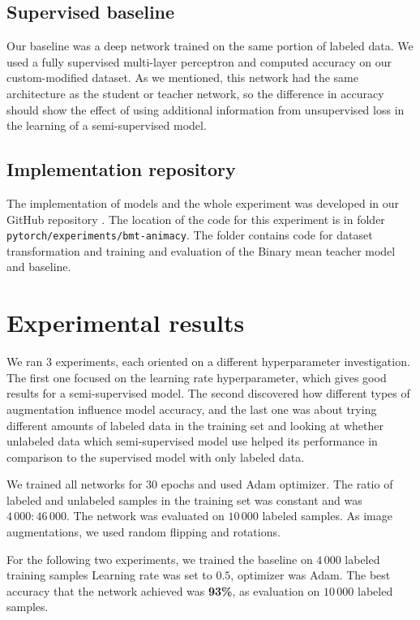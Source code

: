 \subsection{Supervised baseline}
Our baseline was a deep network trained on the same portion of labeled data. We used a fully supervised multi-layer perceptron and computed accuracy on our custom-modified dataset. As we mentioned, this network had the same architecture as the student or teacher network, so the difference in accuracy should show the effect of using additional information from unsupervised loss in the learning of a semi-supervised model. 

\subsection{Implementation repository}
The implementation of models and the whole experiment was developed in our GitHub repository \cite{dt-mt-repo}. The location of the code for this experiment is in folder \\ \texttt{pytorch/experiments/bmt-animacy}. The folder contains code for dataset transformation and training and evaluation of the Binary mean teacher model and baseline.


\section{Experimental results}
We ran 3 experiments, each oriented on a different hyperparameter investigation. The first one focused on the learning rate hyperparameter, which gives good results for a semi-supervised model. The second discovered how different types of augmentation influence model accuracy, and the last one was about trying different amounts of labeled data in the training set and looking at whether unlabeled data which semi-supervised model use helped its performance in comparison to the supervised model with only labeled data.

\label{bmt:training}
We trained all networks for $30$ epochs and used Adam optimizer. The ratio of labeled and unlabeled samples in the training set was constant and was $4\,000:46\,000$. The network was evaluated on $10\,000$ labeled samples. As image augmentations, we used random flipping and rotations.

For the following two experiments, we trained the baseline on $4\,000$ labeled training samples Learning rate was set to $0.5$, optimizer was Adam. The best accuracy that the network achieved was \textbf{93\%}, as evaluation on $10\,000$ labeled samples.


